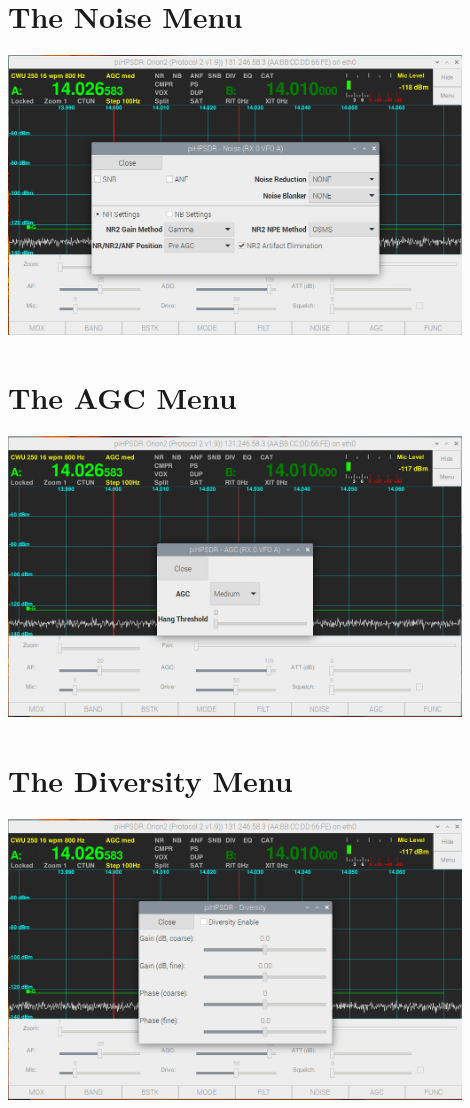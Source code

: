 \documentclass[12pt]{book}
\begin{document}
\section{The Noise Menu}
\begin{center}
\includegraphics[width=12cm]{NoiseMenu.png}
\end{center}

\section{The AGC Menu}
\begin{center}
\includegraphics[width=12cm]{AGCMenu.png}
\end{center}

\section{The Diversity Menu}
\begin{center}
\includegraphics[width=12cm]{DiversityMenu.png}
\end{center}
\end{document}
